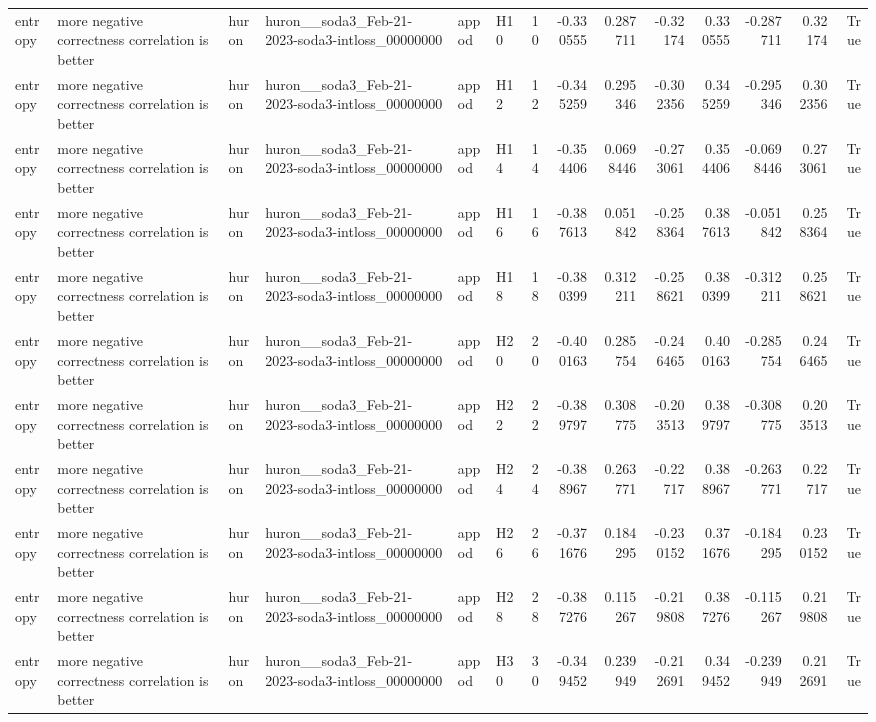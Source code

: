 \begin{longtable}{llllllrrrrrrrr}
entropy & more negative correctness correlation is better & huron & huron\_\_soda3\_Feb-21-2023-soda3-intloss\_00000000 & appod & H10 & 10 & -0.330555 & 0.287711 & -0.32174 & 0.330555 & -0.287711 & 0.32174 & True \\
entropy & more negative correctness correlation is better & huron & huron\_\_soda3\_Feb-21-2023-soda3-intloss\_00000000 & appod & H12 & 12 & -0.345259 & 0.295346 & -0.302356 & 0.345259 & -0.295346 & 0.302356 & True \\
entropy & more negative correctness correlation is better & huron & huron\_\_soda3\_Feb-21-2023-soda3-intloss\_00000000 & appod & H14 & 14 & -0.354406 & 0.0698446 & -0.273061 & 0.354406 & -0.0698446 & 0.273061 & True \\
entropy & more negative correctness correlation is better & huron & huron\_\_soda3\_Feb-21-2023-soda3-intloss\_00000000 & appod & H16 & 16 & -0.387613 & 0.051842 & -0.258364 & 0.387613 & -0.051842 & 0.258364 & True \\
entropy & more negative correctness correlation is better & huron & huron\_\_soda3\_Feb-21-2023-soda3-intloss\_00000000 & appod & H18 & 18 & -0.380399 & 0.312211 & -0.258621 & 0.380399 & -0.312211 & 0.258621 & True \\
entropy & more negative correctness correlation is better & huron & huron\_\_soda3\_Feb-21-2023-soda3-intloss\_00000000 & appod & H20 & 20 & -0.400163 & 0.285754 & -0.246465 & 0.400163 & -0.285754 & 0.246465 & True \\
entropy & more negative correctness correlation is better & huron & huron\_\_soda3\_Feb-21-2023-soda3-intloss\_00000000 & appod & H22 & 22 & -0.389797 & 0.308775 & -0.203513 & 0.389797 & -0.308775 & 0.203513 & True \\
entropy & more negative correctness correlation is better & huron & huron\_\_soda3\_Feb-21-2023-soda3-intloss\_00000000 & appod & H24 & 24 & -0.388967 & 0.263771 & -0.22717 & 0.388967 & -0.263771 & 0.22717 & True \\
entropy & more negative correctness correlation is better & huron & huron\_\_soda3\_Feb-21-2023-soda3-intloss\_00000000 & appod & H26 & 26 & -0.371676 & 0.184295 & -0.230152 & 0.371676 & -0.184295 & 0.230152 & True \\
entropy & more negative correctness correlation is better & huron & huron\_\_soda3\_Feb-21-2023-soda3-intloss\_00000000 & appod & H28 & 28 & -0.387276 & 0.115267 & -0.219808 & 0.387276 & -0.115267 & 0.219808 & True \\
entropy & more negative correctness correlation is better & huron & huron\_\_soda3\_Feb-21-2023-soda3-intloss\_00000000 & appod & H30 & 30 & -0.349452 & 0.239949 & -0.212691 & 0.349452 & -0.239949 & 0.212691 & True \\

\end{longtable}
